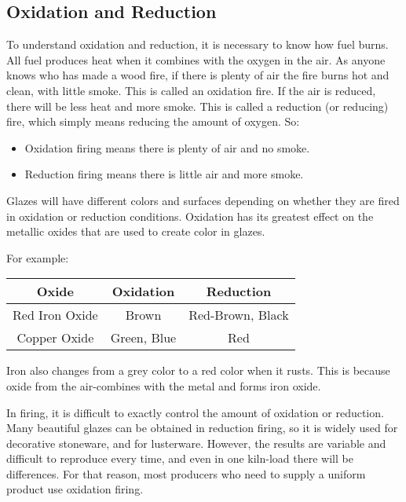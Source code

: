 \subsection{Oxidation and Reduction}
To understand oxidation and reduction, it is necessary to know how fuel burns. 
All fuel produces heat when it combines with the oxygen in the air. As anyone 
knows who has made a wood fire, if there is plenty of air the fire burns hot 
and clean, with little smoke. This is called an oxidation fire. If the air is 
reduced, there will be less heat and more smoke. This is called a reduction (or 
reducing) fire, which simply means reducing the amount of oxygen. So:
\begin{itemize}
\item Oxidation firing means there is plenty of air and no smoke.
\item Reduction firing means there is little air and more smoke.
\end{itemize}
Glazes will have different colors and surfaces depending on whether they are 
fired in oxidation or reduction conditions. Oxidation has its greatest effect 
on the metallic oxides that are used to create color in glazes. 

For example:
\begin{center}
        \renewcommand{\arraystretch}{1.5}
        \begin{tabular}{|c|c|c|}\hline
\textbf{Oxide}&\textbf{Oxidation}&\textbf{Reduction}\\\hline\hline
Red Iron Oxide&Brown&Red-Brown, Black\\\hline
Copper Oxide&Green, Blue&Red\\\hline
\end{tabular}
\end{center}
Iron also changes from a grey color to a red color when it rusts. This is 
because oxide from the air-combines with the metal and forms iron oxide.

In firing, it is difficult to exactly control the amount of oxidation or 
reduction. Many beautiful glazes can be obtained in reduction firing, so it is 
widely used for decorative stoneware, and for lusterware. However, the results 
are variable and difficult to reproduce every time, and even in one kiln-load 
there will be differences. For that reason, most producers who need to supply a 
uniform product use oxidation firing.
